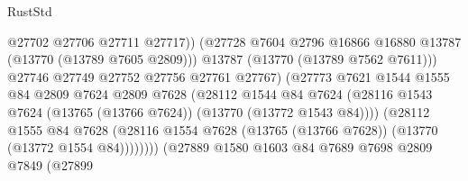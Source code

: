 \begin{lexlean}{RustStd}
\begin{coremodule}
                                            @27702
                                            @27706
                                            @27711
                                            @27717))
                                        (@27728
                                          @7604
                                          @2796
                                          @16866
                                          @16880
                                          @13787
                                          (@13770 (@13789 @7605 @2809)))
                                        @13787
                                        (@13770 (@13789 @7562 @7611)))
                                      @27746
                                      @27749
                                      @27752
                                      @27756
                                      @27761
                                      @27767)
                                    (@27773
                                      @7621
                                      @1544
                                      @1555
                                      @84
                                      @2809
                                      @7624
                                      @2809
                                      @7628
                                      (@28112
                                        @1544
                                        @84
                                        @7624
                                        (@28116
                                          @1543
                                          @7624
                                          (@13765 (@13766 @7624))
                                          (@13770 (@13772 @1543 @84))))
                                      (@28112
                                        @1555
                                        @84
                                        @7628
                                        (@28116
                                          @1554
                                          @7628
                                          (@13765 (@13766 @7628))
                                          (@13770 (@13772 @1554 @84))))))))
                              (@27889
                                @1580
                                @1603
                                @84
                                @7689
                                @7698
                                @2809
                                @7849
                                (@27899

\end{coremodule}
\end{lexlean}
